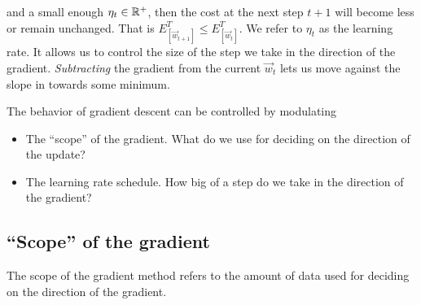 and a small enough $\eta_t \in \mathbb{R}^+$, then the cost at the next step $t+1$ will become less or remain unchanged. That is $E^T_{[\vec w_{t+1}]} \le E^T_{[\vec w_{t}]}$.
We refer to $\eta_t$ as the learning rate. It allows us to control the size of the step we take in the direction of the gradient.
\emph{Subtracting} the gradient from the current $\vec w_t$ lets us move against the slope in towards some minimum. 

The behavior of gradient descent can be controlled by modulating 
\begin{itemize}
\item The ``scope'' of the gradient. What do we use for deciding on the direction of the update?
\item The learning rate schedule. How big of a step do we take in the direction of the gradient?
\end{itemize}


\subsection{``Scope'' of the gradient}

The scope of the gradient method refers to the amount of data used for deciding on the direction of the gradient.


